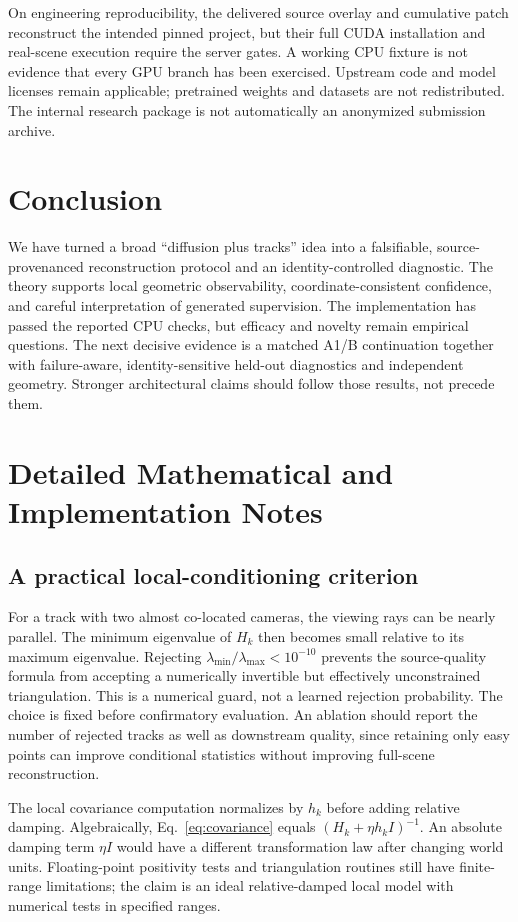 \documentclass[10pt,twocolumn,letterpaper]{article}
\begin{document}
On engineering reproducibility, the delivered source overlay and cumulative patch reconstruct the intended pinned project, but their full CUDA installation and real-scene execution require the server gates. A working CPU fixture is not evidence that every GPU branch has been exercised. Upstream code and model licenses remain applicable; pretrained weights and datasets are not redistributed. The internal research package is not automatically an anonymized submission archive.

\section{Conclusion}
We have turned a broad ``diffusion plus tracks'' idea into a falsifiable, source-provenanced reconstruction protocol and an identity-controlled diagnostic. The theory supports local geometric observability, coordinate-consistent confidence, and careful interpretation of generated supervision. The implementation has passed the reported CPU checks, but efficacy and novelty remain empirical questions. The next decisive evidence is a matched A1/B continuation together with failure-aware, identity-sensitive held-out diagnostics and independent geometry. Stronger architectural claims should follow those results, not precede them.

\clearpage
\appendix
\section{Detailed Mathematical and Implementation Notes}
\subsection{A practical local-conditioning criterion}
For a track with two almost co-located cameras, the viewing rays can be nearly parallel. The minimum eigenvalue of $H_k$ then becomes small relative to its maximum eigenvalue. Rejecting $\lambda_{\min}/\lambda_{\max}<10^{-10}$ prevents the source-quality formula from accepting a numerically invertible but effectively unconstrained triangulation. This is a numerical guard, not a learned rejection probability. The choice is fixed before confirmatory evaluation. An ablation should report the number of rejected tracks as well as downstream quality, since retaining only easy points can improve conditional statistics without improving full-scene reconstruction.

The local covariance computation normalizes by $h_k$ before adding relative damping. Algebraically, Eq.~\eqref{eq:covariance} equals $(H_k+\eta h_kI)^{-1}$. An absolute damping term $\eta I$ would have a different transformation law after changing world units. Floating-point positivity tests and triangulation routines still have finite-range limitations; the claim is an ideal relative-damped local model with numerical tests in specified ranges.
\end{document}
